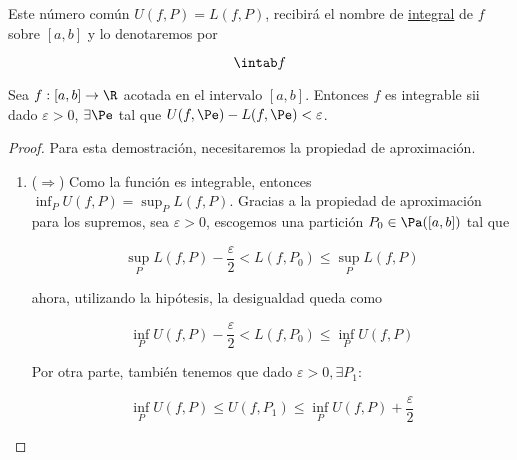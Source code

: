 \begin{nota}
    Este número común $U(f, P) = L(f, P)$, recibirá el nombre de \ul{integral} de $f$ sobre $[a,b]$ y lo denotaremos por
    
    \[
    \intab f
    \]
\end{nota}

\begin{teo}\label{teo:condrie}
    Sea $f: [a,b] \rightarrow \R$ acotada en el intervalo $[a,b]$. Entonces $f$ es integrable sii dado $\varepsilon > 0$, $\exists \Pe$ tal que $U(f, \Pe) - L(f, \Pe) < \varepsilon$.
\end{teo}

\begin{proof}
    Para esta demostración, necesitaremos la propiedad de aproximación.
    
    \begin{enumerate}
        \item ($\Rightarrow$) Como la función es integrable, entonces $\inf_P U(f,P) = \sup_P L(f, P)$. Gracias a la propiedad de aproximación para los supremos, sea $\varepsilon > 0$, escogemos una partición $P_0 \in \Pa([a,b])$ tal que
        
        \[
        \sup_P L(f,P) - \frac{\varepsilon}{2} < L(f,P_0) \leq \sup_P L(f,P)
        \]
        
        ahora, utilizando la hipótesis, la desigualdad queda como
        
        \begin{equation}\label{eq:condrie1}
            \inf_P U(f,P) - \frac{\varepsilon}{2} < L(f,P_0) \leq \inf_P U(f,P)
        \end{equation}
        
        Por otra parte, también tenemos que dado $\varepsilon > 0, \exists P_1:$
        
        \begin{equation}\label{eq:condrie2}
            \inf_P U(f,P) \leq U(f,P_1) \leq \inf_P U(f,P) + \frac{\varepsilon}{2}
        \end{equation}
        

\end{enumerate}
\end{proof}
